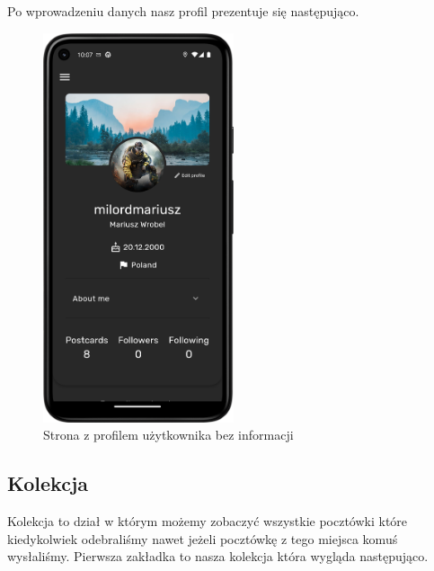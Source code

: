 \documentclass[a4paper,twoside,12pt]{book}
\begin{document}
Po wprowadzeniu danych nasz profil prezentuje się następująco.

\begin{figure}[H]
    \centering
    \includegraphics[width=0.5\textwidth]{mobile_ss/profil_z_info.png}
    \caption{Strona z profilem użytkownika bez informacji}
\end{figure}

\subsection{Kolekcja}
Kolekcja to dział w którym możemy zobaczyć wszystkie pocztówki które kiedykolwiek odebraliśmy nawet jeżeli pocztówkę z tego miejsca komuś wysłaliśmy. Pierwsza zakładka to nasza kolekcja która wygląda następująco. 
\end{document}
